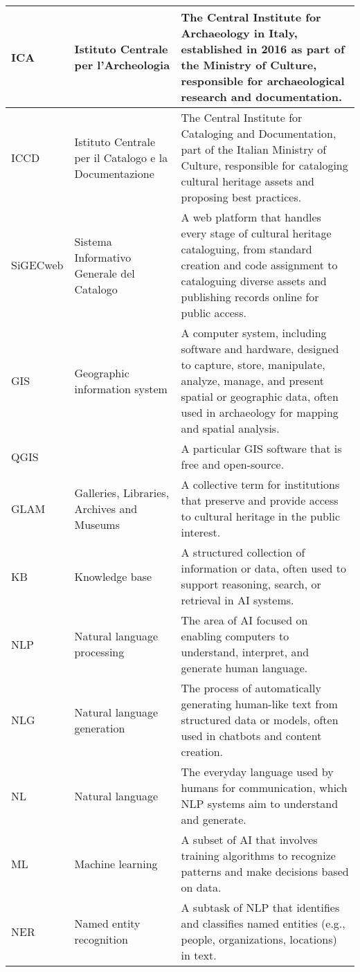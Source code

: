 \begin{tabularx}{\textwidth}{
  >{\raggedright\arraybackslash}p{2.5cm}
  >{\raggedright\arraybackslash}p{4cm}
  >{\noindent\justifying\arraybackslash}X
}
\cmidrule(lr){1-3}
ICA & Istituto Centrale per l’Archeologia & The Central Institute for Archaeology in Italy, established in 2016 as part of the Ministry of Culture, responsible for archaeological research and documentation. \\
\cmidrule(lr){1-3}
ICCD & Istituto Centrale per il Catalogo e la Documentazione & The Central Institute for Cataloging and Documentation, part of the Italian Ministry of Culture, responsible for cataloging cultural heritage assets and proposing best practices. \\
\cmidrule(lr){1-3}
SiGECweb &  Sistema Informativo Generale del Catalogo & A web platform that handles every stage of cultural heritage cataloguing, from standard creation and code assignment to cataloguing diverse assets and publishing records online for public access. \\
\cmidrule(lr){1-3}
GIS & Geographic information system & A computer system, including software and hardware, designed to capture, store, manipulate, analyze, manage, and present spatial or geographic data, often used in archaeology for mapping and spatial analysis. \\
\cmidrule(lr){1-3}
QGIS &  & A particular GIS software that is free and open-source. \\
\cmidrule(lr){1-3}
GLAM   & Galleries, Libraries, Archives and Museums & A collective term for institutions that preserve and provide access to cultural heritage in the public interest. \\
\cmidrule(lr){1-3}
KB    & Knowledge base & A structured collection of information or data, often used to support reasoning, search, or retrieval in AI systems. \\
\cmidrule(lr){1-3}
NLP   & Natural language processing & The area of AI focused on enabling computers to understand, interpret, and generate human language. \\
\cmidrule(lr){1-3}
NLG   & Natural language generation & The process of automatically generating human-like text from structured data or models, often used in chatbots and content creation. \\
\cmidrule(lr){1-3}
NL & Natural language & The everyday language used by humans for communication, which NLP systems aim to understand and generate. \\
\cmidrule(lr){1-3}
ML    & Machine learning & A subset of AI that involves training algorithms to recognize patterns and make decisions based on data. \\
\cmidrule(lr){1-3}
NER   & Named entity recognition & A subtask of NLP that identifies and classifies named entities (e.g., people, organizations, locations) in text. \\

\end{tabularx}
